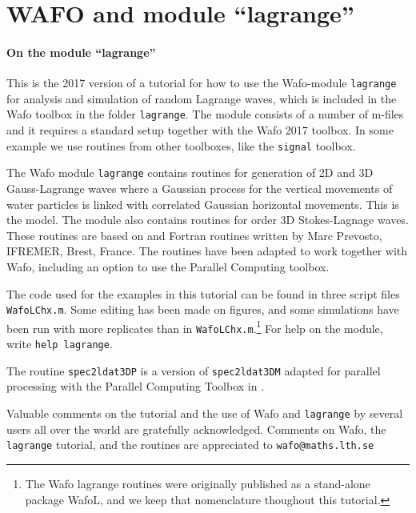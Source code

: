 \cleardoublepage
{}
\chapter*{WAFO and module ``lagrange''}
\vspace{-5mm}

\subsubsection*{On the module ``lagrange''}
This is the 2017 version of a tutorial for how to use the \ML{} {\sc Wafo}-module 
{\tt lagrange} for analysis and simulation of random Lagrange waves, 
which is included in the {\sc Wafo} toolbox in the folder {\tt lagrange}. 
The module consists of a number of \ML{} m-files and it requires a
standard \ML{} setup together with the {\sc Wafo} 2017 toolbox. 
In some example we use routines from other \ML{} toolboxes, 
like the {\tt signal} toolbox. 

The {\sc Wafo} module {\tt lagrange}  contains routines for generation of 2D and 3D 
Gauss-Lagrange waves where a Gaussian process for the vertical movements of water particles is linked with  correlated Gaussian horizontal movements. This is the \fo model.  
The module also contains routines for \so order 3D Stokes-Lagnage waves. 
These routines are based on \ML{} and Fortran routines written by Marc Prevosto, IFREMER, Brest, France. The routines have been adapted to work together with {\sc Wafo}, including an option to use the \ML{} Parallel Computing toolbox.
 
 The \ML{} code used for the examples in this tutorial can be found in three 
 script files \verb+WafoLChx.m+. Some editing has been made on figures, 
 and some simulations have been run with more replicates than in 
 \verb+WafoLChx.m+.\footnote{The {\sc Wafo} lagrange routines were 
 originally published  as a stand-alone package {\sc Wafo}L, and we keep 
 that nomenclature thoughout this tutorial.} For help on the module, write 
 {\tt help lagrange}.

The routine \verb+spec2ldat3DP+ is a version of \verb+spec2ldat3DM+ 
adapted for parallel processing with the Parallel Computing Toolbox in \ML{}. 

Valuable comments on the tutorial and the use of {\sc Wafo} and 
{\tt lagrange} by several users all over the world  are gratefully acknowledged. 
Comments on {\sc Wafo}, the {\tt lagrange} tutorial, and the 
routines are appreciated to 
%
\verb+wafo@maths.lth.se+

